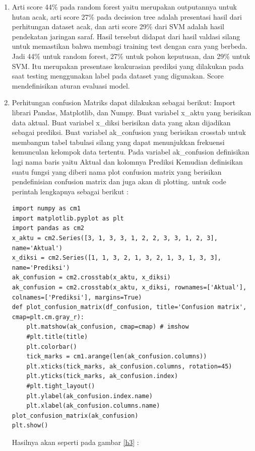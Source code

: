 \begin{enumerate}
\item Arti score 44\% pada random forest yaitu merupakan outputannya untuk hutan acak, arti score 27\% pada decission tree adalah presentasi hasil dari perhitungan dataset acak, dan arti score 29\% dari SVM adalah hasil pendekatan jaringan saraf.  Hasil tersebut didapat dari hasil valdasi silang untuk memastikan bahwa membagi training test dengan cara yang berbeda. Jadi 44\% untuk random forest, 27\% untuk pohon keputusan, dan 29\% untuk SVM. Itu merupakan presentase keakurasian prediksi yang dilakukan pada saat testing menggunakan label pada dataset yang digunakan. Score mendefinisikan aturan evaluasi model.
\item Perhitungan confusion Matriks dapat dilakukan sebagai berikut:
\subitem Import librari Pandas, Matplotlib, dan Numpy.
\subitem Buat variabel x\_aktu yang berisikan data aktual.
\subitem Buat variabel x\_diksi berisikan data yang akan dijadikan sebagai prediksi.
\subitem Buat variabel ak\_confusion yang berisikan crosstab untuk membangun tabel tabulasi silang yang dapat menunjukkan frekuensi kemunculan kelompok data tertentu.
\subitem Pada variabel ak\_confusion definisikan lagi nama baris yaitu Aktual dan kolomnya Prediksi
\subitem Kemudian definisikan suatu fungsi yang diberi nama plot confusion matrix yang berisikan pendefinisian confusion matrix dan juga akan di plotting. untuk code perintah lengkapnya sebagai berikut :
\subitem
\begin{verbatim}
import numpy as cm1
import matplotlib.pyplot as plt
import pandas as cm2
x_aktu = cm2.Series([3, 1, 3, 3, 1, 2, 2, 3, 3, 1, 2, 3], name='Aktual')
x_diksi = cm2.Series([1, 1, 3, 2, 1, 3, 2, 1, 3, 1, 3, 3], name='Prediksi')
ak_confusion = cm2.crosstab(x_aktu, x_diksi)
ak_confusion = cm2.crosstab(x_aktu, x_diksi, rownames=['Aktual'], colnames=['Prediksi'], margins=True)
def plot_confusion_matrix(df_confusion, title='Confusion matrix', cmap=plt.cm.gray_r):
    plt.matshow(ak_confusion, cmap=cmap) # imshow
    #plt.title(title)
    plt.colorbar()
    tick_marks = cm1.arange(len(ak_confusion.columns))
    plt.xticks(tick_marks, ak_confusion.columns, rotation=45)
    plt.yticks(tick_marks, ak_confusion.index)
    #plt.tight_layout()
    plt.ylabel(ak_confusion.index.name)
    plt.xlabel(ak_confusion.columns.name)
plot_confusion_matrix(ak_confusion)
plt.show()
\end{verbatim}
Hasilnya akan seperti pada gambar \ref{h3} :
\begin{figure}[!htbp]

\end{figure}
\end{enumerate}
